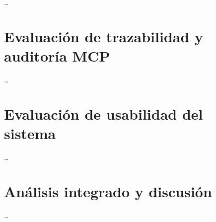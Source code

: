 \ldots

\section{Evaluación de trazabilidad y auditoría MCP}
\label{sec:resultados_trazabilidad}

\ldots

\section{Evaluación de usabilidad del sistema}
\label{sec:resultados_usabilidad}

\ldots

\section{Análisis integrado y discusión}
\label{sec:discusion}

\ldots

